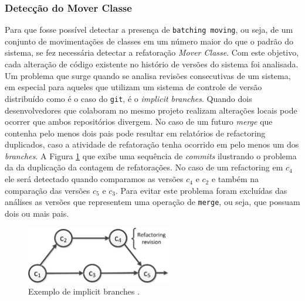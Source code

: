 \documentclass[12pt]{article}
\begin{document}
\subsubsection{Detecção do Mover Classe}

Para que fosse possível detectar a presença de \texttt{batching moving}, ou seja, de um conjunto de movimentações de classes em um número maior do que o padrão do sistema, se fez necessária detectar a refatoração \textit{Mover Classe}. Com este objetivo, cada alteração de código existente no histório de versões do sistema foi analisada. Um problema que surge quando se analisa revisões consecutivas de um sistema, em especial para aqueles que utilizam um sistema de controle de versão distribuído como é o caso do \texttt{git}, é o \textit{implicit branches}{}. Quando dois desenvolvedores que colaboram no mesmo projeto realizam alterações locais pode ocorrer que ambos repositórios divergem. No caso de um futuro \textit{merge}{} que contenha pelo menos dois pais pode resultar em relatórios de refactoring duplicados, caso a atividade de refatoração tenha ocorrido em pelo menos um dos \textit{branches}{}. A  Figura \ref{fig:implicit_brache} que exibe uma sequência de \textit{commits} ilustrando o problema da da duplicação da contagem de refatorações. No caso de um refactoring em $c_4${} ele será detectado quando  comparamos as  versões $c_4$ e $c_2$ e também na comparação das versões $c_5$ e $c_3$. Para evitar este problema foram excluídas das análises as versões que representem uma operação de \texttt{merge}, ou seja, que possuam dois ou mais pais.

\begin{figure}[!t]
	\centering
	\includegraphics[width=2.5in]{../img/implicit_branche}
	\caption{Exemplo de implicit branches \cite{Tsantalis2013}{}.}
	\label{fig:implicit_brache}
\end{figure}
\end{document}
